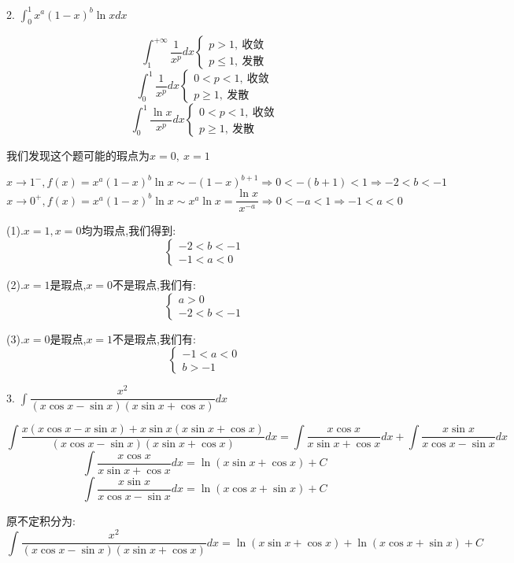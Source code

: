 2. $\int_{0}^{1}x^{a}(1-x)^{b}\ln xdx$
\begin{lemma}[特殊反常积分]\label{lem: 特殊反常积分}
	
	$$\int_{1}^{+\infty}\dfrac{1}{x^p}dx\left\lbrace 
	\begin{array}{l}
		p>1,\ \text{收敛}\\
		p\leq 1,\ \text{发散}
	\end{array}
	\right. $$
	$$\int_{0}^{1}\dfrac{1}{x^p}dx\left\lbrace 
	\begin{array}{l}
		0<p<1,\ \text{收敛}\\
		p\geq 1,\ \text{发散}
	\end{array}
	\right. $$
	$$\int_{0}^{1}\dfrac{\ln x}{x^p}dx\left\lbrace 
	\begin{array}{l}
		0<p<1,\ \text{收敛}\\
		p\geq 1,\ \text{发散}
	\end{array}
	\right. $$
\end{lemma}
\begin{solution}
	
	我们发现这个题可能的瑕点为$x=0,\ x=1$
	
	$$x\rightarrow 1^{-},f(x)=x^a(1-x)^b\ln x\sim -(1-x)^{b+1}\Rightarrow 0<-(b+1)<1\Rightarrow -2<b<-1$$
	$$x\rightarrow 0^{+},f(x)=x^a(1-x)^b\ln x\sim x^a\ln x=\dfrac{\ln x}{x^{-a}}\Rightarrow 0<-a<1\Rightarrow -1<a<0$$
	
	(1).$x=1,x=0$均为瑕点,我们得到: 
	$$\left\lbrace 
	\begin{array}{l}
		-2<b<-1\\
		-1<a<0
	\end{array}
	\right. $$
	
	(2).$x=1$是瑕点,$x=0$不是瑕点,我们有: 
	$$\left\lbrace 
	\begin{array}{l}
		a>0\\-2<b<-1
	\end{array}
	\right. $$
	
	(3).$x=0$是瑕点,$x=1$不是瑕点,我们有: 
	$$\left\lbrace 
	\begin{array}{l}
		-1<a<0\\b>-1
	\end{array}
	\right. $$
\end{solution}


3. $\int\dfrac{x^2}{(x\cos x-\sin x)(x\sin x+\cos x)}dx$
\begin{solution}
	
	$$\int\frac{x(x\cos x-x\sin x)+x\sin x(x\sin x+\cos x)}{(x\cos x-\sin x)(x\sin x+\cos x)}dx=\int\frac{x\cos x}{x\sin x+\cos x}dx+\int\frac{x\sin x}{x\cos x-\sin x}dx$$
	$$\int\frac{x\cos x}{x\sin x+\cos x}dx=\ln(x\sin x+\cos x)+C$$
	$$\int\frac{x\sin x}{x\cos x-\sin x}dx=\ln(x\cos x+\sin x)+C$$
	
	原不定积分为: 
	$$\int\frac{x^2}{(x\cos x-\sin x)(x\sin x+\cos x)}dx=\ln(x\sin x+\cos x)+\ln(x\cos x+\sin x)+C$$
\end{solution}

